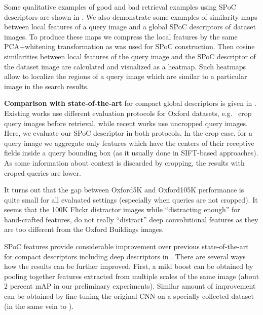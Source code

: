 Some qualitative examples of good and bad retrieval examples using SPoC descriptors are shown in . We also demonstrate some examples of similarity maps between local features of a query image and a global SPoC descriptors of dataset images. To produce these maps we compress the local features by the same PCA+whitening transformation as was used for SPoC construction. Then cosine similarities between local features of the query image and the SPoC descriptor of the dataset image are calculated and visualized as a heatmap. Such heatmaps allow to localize the regions of a query image which are similar to a particular image in the search results. 

{\bf Comparison with state-of-the-art} for compact global descriptors is given in . Existing works use different evaluation protocols for Oxford datasets, e.g.~\cite{Jegou14,Tolias13} crop query images before retrieval, while recent works \cite{Razavian15,Babenko14,Azizpour14,Razavian14} use uncropped query images. Here, we evaluate our SPoC descriptor in both protocols. In the crop case, for a query image we aggregate only features which have the centers of their receptive fields inside a query bounding box (as it usually done in SIFT-based approaches). As some information about context is discarded by cropping, the results with croped queries are lower.

It turns out that the gap between Oxford5K and Oxford105K performance is quite small for all evaluated settings (especially when queries are not cropped). It seems that the 100K Flickr distractor images while ``distracting enough'' for hand-crafted features, do not really ``distract'' deep convolutional features as they are too different from the Oxford Buildings images.

SPoC features provide considerable improvement over previous state-of-the-art for compact descriptors including deep descriptors in \cite{Babenko14, Gong14, Razavian15}. There are several ways how the results can be further improved. First, a mild boost can be obtained by pooling together features extracted from multiple scales of the same image (about $2$ percent mAP in our preliminary experiments). Similar amount of improvement can be obtained by fine-tuning the original CNN on a specially collected dataset (in the same vein to \cite{Babenko14}). 



